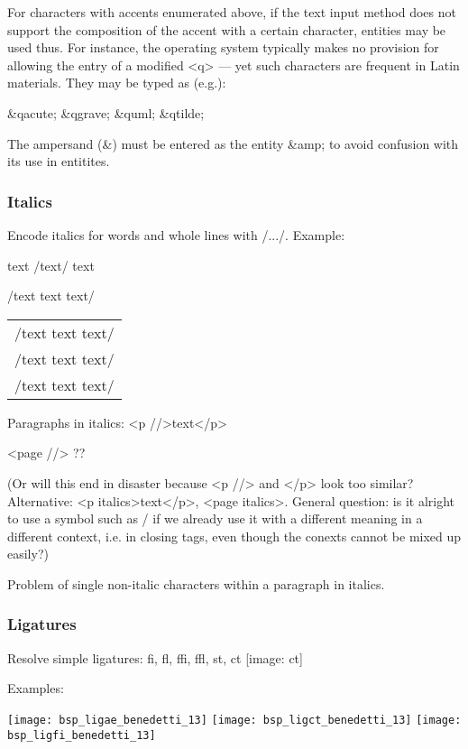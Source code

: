 For characters with accents enumerated above, if the text input method does not support the composition of the accent with a certain character, entities may be used thus. For instance, the operating system typically makes no provision for allowing the entry of a modified <q> — yet such characters are frequent in Latin materials. They may be typed as (e.g.):

\qquad \&qacute; \&qgrave; \&quml; \&qtilde; 

The ampersand (\&) must be entered as the entity \&amp; to avoid confusion with its use in entitites.


\subsubsection{Italics}

Encode italics for words and whole lines with /.../. Example:

text /text/ text

/text text text/

\begin{tabular}{l}
/text text text/ \\
/text text text/ \\
/text text text/ \\
\end{tabular}

Paragraphs in italics: <p //>text</p> 
 
<page //> ??

(Or will this end in disaster because <p //> and </p> look too similar? Alternative: <p italics>text</p>, <page italics>. General question: is it alright to use a symbol such as / if we already use it with a different meaning in a different context, i.e. in closing tags, even though the conexts cannot be mixed up easily?)

Problem of single non-italic characters within a paragraph in italics.

\subsubsection{Ligatures}

Resolve simple ligatures: fi, fl, ffi, ffl, st, ct  [image: ct]

Examples:

\texttt{[image: bsp\_ligae\_benedetti\_13]}
\texttt{[image: bsp\_ligct\_benedetti\_13]}
\texttt{[image: bsp\_ligfi\_benedetti\_13]}

